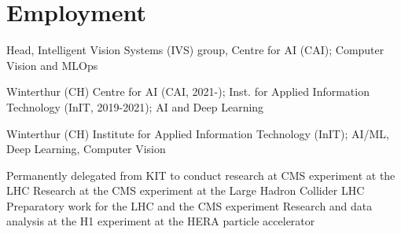 \documentclass[10pt,a4paper,sans]{moderncv}
\begin{document}
\maketitle


\section{Employment}



{Head, Intelligent Vision Systems (IVS) group, Centre for AI (CAI); Computer Vision and MLOps
}

 {Winterthur (CH)}{}
{Centre for AI (CAI, 2021-); Inst. for Applied Information Technology (InIT, 2019-2021); AI and Deep Learning 
}

 {Winterthur (CH)}{} 
{Institute for Applied Information Technology (InIT); AI/ML, Deep Learning, Computer Vision}

%
%

{Permanently delegated from KIT to conduct research at CMS experiment at the LHC}
%
{Research at the CMS experiment at the Large Hadron Collider LHC%
}
%
{ Preparatory work for the LHC and the CMS experiment
}
%
{Research and data analysis at the H1 experiment at the HERA particle accelerator
}
\end{document}
